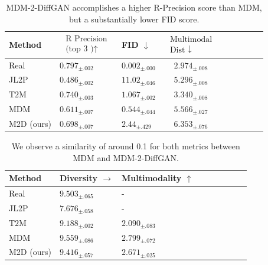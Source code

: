 \documentclass[10pt,twocolumn,letterpaper]{article}
\begin{document}
\begin{table}[H]
    \centering
    \begin{tabular}{|p{1.4cm}|p{1.8cm}|p{1.5cm}|c|c|c|c|c|c|}
    \hline Method & $\begin{array}{l}\text { R Precision } \\
    \text { (top } 3 \text { )↑ }\end{array}$ & FID $\downarrow$ & $\begin{array}{c}\text { Multimodal } \\
    \text { Dist } \downarrow\end{array}$ \\
    \hline Real & $0.797_{ \pm .002}$ & $0.002_{ \pm .000}$ & $2.974_{ \pm .008}$ \\
    \hline JL2P & $0.486_{ \pm .002}$ & $11.02_{ \pm .046}$ & $5.296_{ \pm .008}$ \\
    \hline $\mathrm{T} 2 \mathrm{M}$ & $0.740_{ \pm .003}$ & $1.067_{ \pm .002}$ & $3.340_{ \pm .008}$ \\
    \hline MDM & $0.611_{ \pm .007}$ & $0.544_{ \pm .044}$ & $5.566_{ \pm .027}$ \\
    \hline M2D (ours) & $0.698_{ \pm .007}$ & $2.44_{ \pm .429}$ & $6.353_{ \pm .076}$ \\
    \hline
    \end{tabular}
    \caption{MDM-2-DiffGAN accomplishes a higher R-Precision score than MDM, but a substantially lower FID score.}
    \label{tab:metrics}
\end{table}
\begin{table}[H]
    \begin{tabular}{|p{2cm}|p{2cm}|p{2cm}|c|c|c|c|c|c|}
        \hline Method & Diversity $\rightarrow$ & Multimodality $\uparrow$ \\
        \hline Real & $9.503_{ \pm .065}$ & - \\
        \hline JL2P & $7.676_{ \pm .058}$ & - \\
        \hline $\mathrm{T} 2 \mathrm{M}$ & $9.188_{ \pm .002}$ & $2.090_{ \pm .083}$ \\
        \hline MDM & $9.559_{ \pm .086}$ & $2.799_{ \pm .072}$ \\
        \hline M2D (ours) & $9.416_{ \pm .057}$ & $2.671_{ \pm .025}$ \\
        \hline
        \end{tabular}
    \caption{We observe a similarity of around 0.1 for both metrics between MDM and MDM-2-DiffGAN.}
    \label{tab:metrics2}
\end{table}
\end{document}

